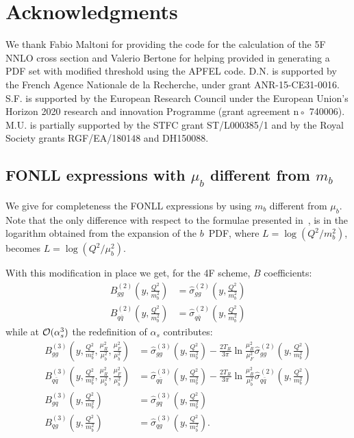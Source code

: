 \documentclass[12pt]{article}
\newcommand{\order}[1]{{\cal O}(#1)}
\begin{document}
\section*{Acknowledgments}
We thank Fabio Maltoni for providing the code for the calculation of the 5F NNLO
cross section and  Valerio Bertone for helping provided in generating
a PDF set with modified threshold  using the APFEL code. 
D.N. is supported by the French Agence Nationale de la Recherche, under
grant ANR-15-CE31-0016. S.F. is supported by the European Research Council
under the European Union’s Horizon 2020 research and innovation
Programme (grant agreement  n◦ 740006). M.U. is partially supported by the 
STFC grant ST/L000385/1 and by the Royal Society grants RGF/EA/180148
 and DH150088.
\begin{appendix}
  \section{FONLL expressions with $\mu_b$ different from $m_b$}
  \setcounter{equation}{0}
  We give for completeness the FONLL expressions by using $m_b$ different from $\mu_b$.
  Note that the only difference with respect to the formulae presented in~\cite{Forte:2016sja},
  is in the logarithm obtained from the expansion of the $b$~PDF, where $L=\log(Q^2/m_b^2)$,
  becomes $L=\log(Q^2/\mu_b^2)$.

  With this modification in place we get, for the 4F scheme, $B$ coefficients:
  \begin{align}
    B_{gg}^{(2)}\left(y,\frac{Q^2}{m^2_b}\right)        & = \hat{\sigma}_{gg}^{(2)}\left(y,\frac{Q^2}{m_b^2}\right) \\
    B_{q\bar{q}}^{(2)}\left(y,\frac{Q^2}{m^2_b}\right) & = \hat{\sigma}_{q\bar{q}}^{(2)}\left(y,\frac{Q^2}{m_b^2}\right)
  \end{align}
  while at $\order{\alpha_s^3}$ the redefinition of $\alpha_s$ contributes:
  \begin{align}
    B_{gg}^{(3)}\left(y,\frac{Q^2}{m^2_b},\frac{\mu_R^2}{\mu_b^2},\frac{\mu_F^2}{\mu_b^2}\right) & = \hat{\sigma}_{gg}^{(3)}\left(y,\frac{Q^2}{m_b^2}\right) - \frac{2 T_R}{3\pi} \ln{\frac{\mu_R^2}{\mu_F^2}}\hat{\sigma}_{gg}^{(2)}\left(y,\frac{Q^2}{m_b^2}\right)\\
    B_{q\bar{q}}^{(3)}\left(y,\frac{Q^2}{m^2_b},\frac{\mu_R^2}{\mu_b^2},\frac{\mu_F^2}{\mu_b^2}\right) & = \hat{\sigma}_{q\bar{q}}^{(3)}\left(y,\frac{Q^2}{m_b^2}\right)- \frac{2 T_R}{3\pi} \ln{\frac{\mu_R^2}{\mu_b^2}}\hat{\sigma}_{q\bar{q}}^{(2)}\left(y,\frac{Q^2}{m_b^2}\right) \\
    B_{gq}^{(3)}\left(y,\frac{Q^2}{m^2_b}\right)      & = \hat{\sigma}_{gq}^{(3)}\left(y,\frac{Q^2}{m_b^2}\right) \\
    B_{qg}^{(3)}\left(y,\frac{Q^2}{m^2_b}\right)      & = \hat{\sigma}_{qg}^{(3)}\left(y,\frac{Q^2}{m_b^2}\right).
  \end{align}


\end{appendix}
\end{document}
